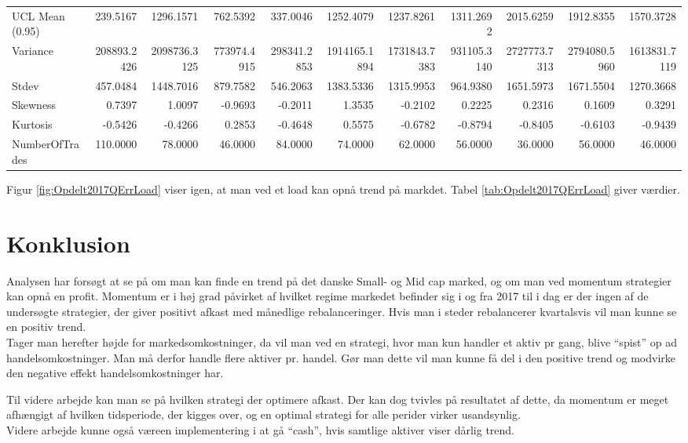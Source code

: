 \documentclass[]{article}
\begin{document}
\begin{table}
{\begin{tabular}[t]{lrrrrrrrrrr}
UCL Mean (0.95) & 239.5167 & 1296.1571 & 762.5392 & 337.0046 & 1252.4079 & 1237.8261 & 1311.2692 & 2015.6259 & 1912.8355 & 1570.3728\\
Variance & 208893.2426 & 2098736.3125 & 773974.4915 & 298341.2853 & 1914165.1894 & 1731843.7383 & 931105.3140 & 2727773.7313 & 2794080.5960 & 1613831.7119\\
Stdev & 457.0484 & 1448.7016 & 879.7582 & 546.2063 & 1383.5336 & 1315.9953 & 964.9380 & 1651.5973 & 1671.5504 & 1270.3668\\
Skewness & 0.7397 & 1.0097 & -0.9693 & -0.2011 & 1.3535 & -0.2102 & 0.2225 & 0.2316 & 0.1609 & 0.3291\\
\addlinespace
Kurtosis & -0.5426 & -0.4266 & 0.2853 & -0.4648 & 0.5575 & -0.6782 & -0.8794 & -0.8405 & -0.6103 & -0.9439\\
NumberOfTrades & 110.0000 & 78.0000 & 46.0000 & 84.0000 & 74.0000 & 62.0000 & 56.0000 & 36.0000 & 56.0000 & 46.0000\\
\bottomrule
\end{tabular}}
\end{table}

Figur \ref{fig:Opdelt2017QErrLoad} viser igen, at man ved et load kan
opnå trend på markdet. Tabel \ref{tab:Opdelt2017QErrLoad} giver værdier.

\hypertarget{konklusion}{%
\section{Konklusion}\label{konklusion}}

Analysen har forsøgt at se på om man kan finde en trend på det danske
Small- og Mid cap marked, og om man ved momentum strategier kan opnå en
profit. Momentum er i høj grad påvirket af hvilket regime markedet
befinder sig i og fra 2017 til i dag er der ingen af de undersøgte
strategier, der giver positivt afkast med månedlige rebalanceringer.
Hvis man i steder rebalancerer kvartalsvis vil man kunne se en positiv
trend.\\
Tager man herefter højde for markedsomkostninger, da vil man ved en
strategi, hvor man kun handler et aktiv pr gang, blive ``spist'' op ad
handelsomkostninger. Man må derfor handle flere aktiver pr. handel. Gør
man dette vil man kunne få del i den positive trend og modvirke den
negative effekt handelsomkostninger har.

Til videre arbejde kan man se på hvilken strategi der optimere afkast.
Der kan dog tvivles på resultatet af dette, da momentum er meget
afhængigt af hvilken tidsperiode, der kigges over, og en optimal
strategi for alle perider virker usandsynlig.\\
Videre arbejde kunne også væreen implementering i at gå ``cash'', hvis
samtlige aktiver viser dårlig trend.
\end{document}
